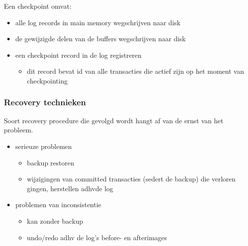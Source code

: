 \documentclass[a4paper,12pt]{article}
\begin{document}
Een checkpoint omvat:
\begin{itemize}
\item alle log records in main memory wegschrijven naar disk
\item de gewijzigde delen van de buffers wegschrijven naar disk
\item een checkpoint record in de log registreren
	\begin{itemize}
	\item dit record bevat id van alle transacties die actief zijn op het moment van checkpointing
	\end{itemize}
\end{itemize}

\subsubsection{Recovery technieken}
Soort recovery procedure die gevolgd wordt hangt af van de ernst van het probleem.
\begin{itemize}
\item serieuze problemen
	\begin{itemize}
	\item backup restoren
	\item wijzigingen van committed transacties (sedert de backup) die verloren gingen, herstellen adhvde log
	\end{itemize}
\item problemen van inconsistentie
	\begin{itemize}
	\item kan zonder backup
	\item undo/redo adhv de log's before- en afterimages
	\end{itemize}
\end{itemize}
\end{document}
